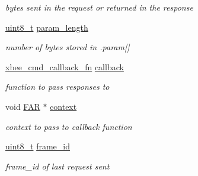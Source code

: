 \begin{DoxyCompactItemize}
\begin{DoxyCompactList}\small\item\em bytes sent in the request or returned in the response \end{DoxyCompactList}\item 
\mbox{\label{structxbee__cmd__request__t_a2045e9bf1b048b408cc9fdc02271e494}} 
\hyperlink{group__hal__dos_gae1affc9ca37cfb624959c866a73f83c2}{uint8\+\_\+t} \hyperlink{structxbee__cmd__request__t_a2045e9bf1b048b408cc9fdc02271e494}{param\+\_\+length}
\begin{DoxyCompactList}\small\item\em number of bytes stored in .param\mbox{[}\mbox{]} \end{DoxyCompactList}\item 
\mbox{\label{structxbee__cmd__request__t_a5d0bf7245ec4d667898f583a0384efb3}} 
\hyperlink{group__xbee__atcmd_ga113cbd0a40a638710974218de5f885fe}{xbee\+\_\+cmd\+\_\+callback\+\_\+fn} \hyperlink{structxbee__cmd__request__t_a5d0bf7245ec4d667898f583a0384efb3}{callback}
\begin{DoxyCompactList}\small\item\em function to pass responses to \end{DoxyCompactList}\item 
\mbox{\label{structxbee__cmd__request__t_aa91f8e864e06077c354e5f5216547758}} 
void \hyperlink{group__hal_gaef060b3456fdcc093a7210a762d5f2ed}{F\+AR} $\ast$ \hyperlink{structxbee__cmd__request__t_aa91f8e864e06077c354e5f5216547758}{context}
\begin{DoxyCompactList}\small\item\em context to pass to callback function \end{DoxyCompactList}\item 
\mbox{\label{structxbee__cmd__request__t_a03c1016ac46b9df250b994f242cf956a}} 
\hyperlink{group__hal__dos_gae1affc9ca37cfb624959c866a73f83c2}{uint8\+\_\+t} \hyperlink{structxbee__cmd__request__t_a03c1016ac46b9df250b994f242cf956a}{frame\+\_\+id}
\begin{DoxyCompactList}\small\item\em frame\+\_\+id of last request sent \end{DoxyCompactList}\item 

\end{DoxyCompactItemize}

